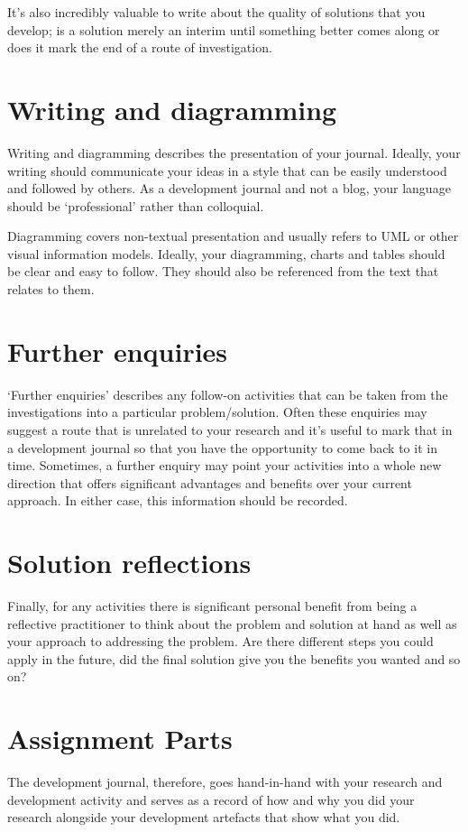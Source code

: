 \documentclass{../common/fal_assignment}
\begin{document}
It's also incredibly valuable to write about the quality of solutions that you develop; is a solution merely an interim until something better comes along or does it mark the end of a route of investigation.

\section*{Writing and diagramming}
Writing and diagramming describes the presentation of your journal. Ideally, your writing should communicate your ideas in a style that can be easily understood and followed by others. As a development journal and not a blog, your language should be `professional' rather than colloquial.

Diagramming covers non-textual presentation and usually refers to UML or other visual information models. Ideally, your diagramming, charts and tables should be clear and easy to follow. They should also be referenced from the text that relates to them.

\section*{Further enquiries}
`Further enquiries' describes any follow-on activities that can be taken from the investigations into a particular problem/solution. Often these enquiries may suggest a route that is unrelated to your research and it's useful to mark that in a development journal so that you have the opportunity to come back to it in time. Sometimes, a further enquiry may point your activities into a whole new direction that offers significant advantages and benefits over your current approach. In either case, this information should be recorded.

\section*{Solution reflections}
Finally, for any activities there is significant personal benefit from being a reflective practitioner to think about the problem and solution at hand as well as your approach to addressing the problem. Are there different steps you could apply in the future, did the final solution give you the benefits you wanted and so on?

\section*{Assignment Parts}
The development journal, therefore, goes hand-in-hand with your research and development activity and serves as a record of how and why you did your research alongside your development artefacts that show what you did.
\end{document}

